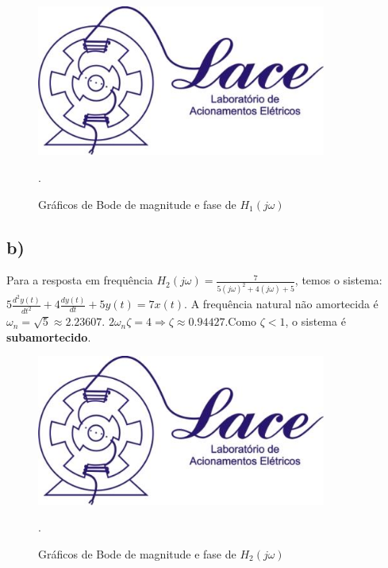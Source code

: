 \documentclass[a4paper,12pt,oneside,openany,table,xcdraw]{article}
\begin{document}
\begin{figure}[H]
    \centering
    \includegraphics[width=0.85\textwidth]{a}
    \caption{Gráficos de Bode de magnitude e fase de $H_1(j\omega)$}.
    \label{fig:my_label}
\end{figure}

\subsection{b)}
Para a resposta em frequência $H_2(j\omega)=\frac{7}{5(j\omega)^2+4(j\omega)+5}$, temos o sistema:\\
$5\frac{d^2y(t)}{dt^2}+4\frac{dy(t)}{dt}+5y(t)=7x(t)$.\newline
\newline
A frequência natural não amortecida é $\omega_n = \sqrt{5} \approx 2.23607$.
\newline
$2\omega_n\zeta=4 \Longrightarrow \zeta \approx 0.94427$.Como $\zeta<1$, o sistema é \textbf{subamortecido}.

\begin{figure}[H]
    \centering
    \includegraphics[width=0.85\textwidth]{a}
    \caption{Gráficos de Bode de magnitude e fase de $H_2(j\omega)$}.
    \label{fig:my_label}
\end{figure}
\end{document}
